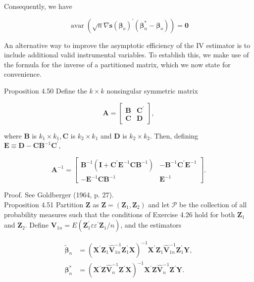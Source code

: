 \documentclass[10pt]{article}
\begin{document}
Consequently, we have

$$
\operatorname{avar}\left(\sqrt{n} \nabla \mathbf{s}\left(\boldsymbol{\beta}_{o}\right)^{\prime}\left(\boldsymbol{\beta}_{n}^{*}-\boldsymbol{\beta}_{o}\right)\right)=\mathbf{0}
$$

An alternative way to improve the asymptotic efficiency of the IV estimator is to include additional valid instrumental variables. To establish this, we make use of the formula for the inverse of a partitioned matrix, which we now state for convenience.

Proposition 4.50 Define the $k \times k$ nonsingular symmetric matrix

$$
\mathbf{A}=\left[\begin{array}{ll}
\mathbf{B} & \mathbf{C}^{\prime} \\
\mathbf{C} & \mathbf{D}
\end{array}\right],
$$

where $\mathbf{B}$ is $k_{1} \times k_{1}, \mathbf{C}$ is $k_{2} \times k_{1}$ and $\mathbf{D}$ is $k_{2} \times k_{2}$. Then, defining $\mathbf{E} \equiv \mathbf{D}-\mathbf{C B}^{-1} \mathbf{C}^{\prime}$,

$$
\mathbf{A}^{-1}=\left[\begin{array}{cc}
\mathbf{B}^{-1}\left(\mathbf{I}+\mathbf{C}^{\prime} \mathbf{E}^{-1} \mathbf{C B}^{-1}\right) & -\mathbf{B}^{-1} \mathbf{C}^{\prime} \mathbf{E}^{-1} \\
-\mathbf{E}^{-1} \mathbf{C B}^{-1} & \mathbf{E}^{-1}
\end{array}\right] .
$$

Proof. See Goldberger (1964, p. 27).\\
Proposition 4.51 Partition $\mathbf{Z}$ as $\mathbf{Z}=\left(\mathbf{Z}_{1}, \mathbf{Z}_{2}\right)$ and let $\mathcal{P}$ be the collection of all probability measures such that the conditions of Exercise 4.26 hold for both $\mathbf{Z}_{1}$ and $\mathbf{Z}_{2}$. Define $\mathbf{V}_{1 n}=E\left(\mathbf{Z}_{1}^{\prime} \varepsilon \varepsilon^{\prime} \mathbf{Z}_{1} / n\right)$, and the estimators

$$
\begin{aligned}
\tilde{\boldsymbol{\beta}}_{n} & =\left(\mathbf{X}^{\prime} \mathbf{Z}_{1} \hat{\mathbf{V}}_{1 n}^{-1} \mathbf{Z}_{1}^{\prime} \mathbf{X}\right)^{-1} \mathbf{X}^{\prime} \mathbf{Z}_{1} \hat{\mathbf{V}}_{1 n}^{-1} \mathbf{Z}_{1}^{\prime} \mathbf{Y}, \\
\boldsymbol{\beta}_{n}^{*} & =\left(\mathbf{X}^{\prime} \mathbf{Z} \hat{\mathbf{V}}_{n}^{-1} \mathbf{Z}^{\prime} \mathbf{X}\right)^{-1} \mathbf{X}^{\prime} \mathbf{Z} \hat{\mathbf{V}}_{n}^{-1} \mathbf{Z}^{\prime} \mathbf{Y} .
\end{aligned}
$$
\end{document}
